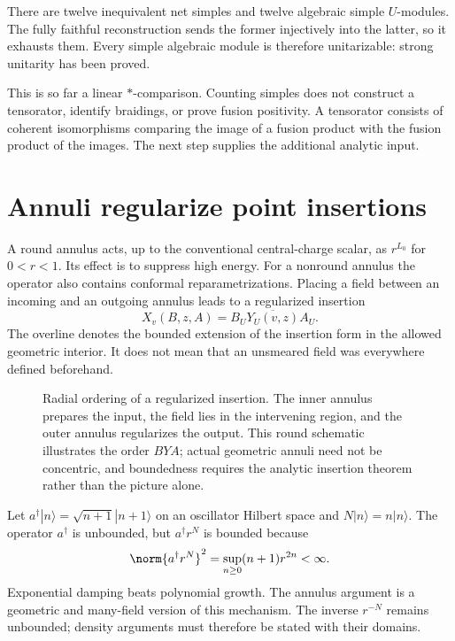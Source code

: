 There are twelve inequivalent net simples and twelve algebraic
simple $U$-modules. The fully faithful reconstruction sends the
former injectively into the latter, so it exhausts them. Every
simple algebraic module is therefore unitarizable: strong unitarity
has been proved.

This is so far a linear $*$-comparison. Counting simples does not
construct a tensorator, identify braidings, or prove fusion
positivity. A tensorator consists of coherent isomorphisms comparing
the image of a fusion product with the fusion product of the images.
The next step supplies the additional analytic input.

\section{Annuli regularize point insertions}

A round annulus acts, up to the conventional central-charge scalar,
as $r^{L_0}$ for $0<r<1$. Its effect is to suppress high energy.
For a nonround annulus the operator also contains conformal
reparametrizations. Placing a field between an incoming and an
outgoing annulus leads to a regularized insertion
\begin{equation}
 X_v(B,z,A)=\overline{B_UY_U(v,z)A_U}.
 \label{eq:unitarity-annulus}
\end{equation}
The overline denotes the bounded extension of the insertion form
in the allowed geometric interior. It does not mean that an
unsmeared field was everywhere defined beforehand.

\begin{figure}[htbp]
\centering

\caption{Radial ordering of a regularized insertion. The inner
annulus prepares the input, the field lies in the intervening
region, and the outer annulus regularizes the output. This round
schematic illustrates the order $BYA$; actual geometric annuli
need not be concentric, and boundedness requires the analytic
insertion theorem rather than the picture alone.}
\label{fig:unitarity-annuli}
\end{figure}

\begin{example}
Let $a^\dagger|n\rangle=\sqrt{n+1}|n+1\rangle$ on an oscillator
Hilbert space and $N|n\rangle=n|n\rangle$.
The operator $a^\dagger$ is unbounded, but
$a^\dagger r^N$ is bounded because
\[
 \norm{a^\dagger r^N}^2
 =\sup_{n\ge0}(n+1)r^{2n}<\infty.
\]
Exponential damping beats polynomial growth. The annulus argument
is a geometric and many-field version of this mechanism.
The inverse $r^{-N}$ remains unbounded; density arguments must
therefore be stated with their domains.
\end{example}

